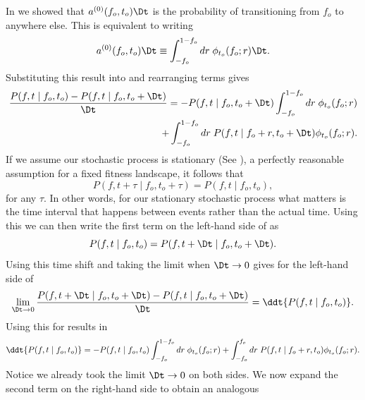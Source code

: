 In  we showed that $a^{(0)}(f_o, t_o)\Dt$ is the probability of
transitioning from $f_o$ to anywhere else. This is equivalent to writing
\begin{equation}
	a^{(0)}(f_o, t_o) \Dt \equiv \int_{-f_o}^{1 - f_o} dr \;
	\phi_{t_o}(f_o; r) \Dt.
\end{equation}
Substituting this result into  and
rearranging terms gives
\begin{equation}
	\begin{split}
	{P(f, t \mid f_o, t_o) - P(f, t \mid f_o, t_o + \Dt) \over \Dt} =
	- P(f, t \mid f_o, t_o + \Dt) \int_{-f_o}^{1 - f_o} dr \;
	\phi_{t_o}(f_o; r)\\
	+ \int_{-f_o}^{1 - f_o} dr \;
	P(f, t \mid f_o + r, t_o + \Dt) \phi_{t_o}(f_o; r).
	\end{split}
	\label{eq_almost_kolmogorov_backwards}
\end{equation}
If we assume our stochastic process is stationary (See
), a perfectly reasonable assumption for a
fixed fitness landscape, it follows that
\begin{equation}
	 P(f, t + \tau \mid f_o, t_o + \tau) = P(f, t \mid f_o, t_o),
\end{equation}
for any $\tau$. In other words, for our stationary stochastic process what
matters is the time interval that happens between events rather than the actual
time. Using this we can then write the first term on the left-hand side of
 as
\begin{equation}
	P(f, t \mid f_o, t_o) = P(f, t + \Dt \mid f_o, t_o + \Dt).
\end{equation}
Using this time shift and taking the limit when $\Dt \rightarrow 0$ gives for
the left-hand side of 
\begin{equation}
	\lim_{\Dt \rightarrow 0} {P(f, t + \Dt \mid f_o, t_o + \Dt) -
	P(f, t \mid f_o, t_o + \Dt) \over \Dt} =
	\ddt{P(f, t \mid f_o, t_o)}.
\end{equation}
Using this for  results in
\begin{equation}
	\ddt{P(f, t \mid f_o, t_o)} =
	- P(f, t \mid f_o, t_o) \int_{- f_o}^{1 - f_o} dr \; \phi_{t_o}(f_o; r)
	+ \int_{- f_o}^{f_o} dr \; P(f, t \mid f_o + r, t_o) \phi_{t_o}(f_o; r).
\end{equation}
Notice we already took the limit $\Dt \rightarrow 0$ on both sides. We now
expand the second term on the right-hand side to obtain an analogous
